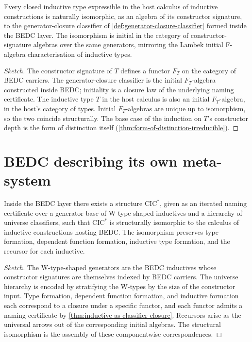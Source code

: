 \begin{theorem}
\label{thm:inductive-as-classifier-closure}
Every closed inductive type expressible in the host calculus of inductive constructions is naturally isomorphic, as an algebra of its constructor signature, to the generator-closure classifier of \autoref{def:generator-closure-classifier} formed inside the BEDC layer. The isomorphism is initial in the category of constructor-signature algebras over the same generators, mirroring the Lambek initial F-algebra characterisation of inductive types.
\end{theorem}

\begin{proof}[Sketch]
The constructor signature of $T$ defines a functor $F_T$ on the category of BEDC carriers. The generator-closure classifier is the initial $F_T$-algebra constructed inside BEDC; initiality is a closure law of the underlying naming certificate. The inductive type $T$ in the host calculus is also an initial $F_T$-algebra, in the host's category of types. Initial $F_T$-algebras are unique up to isomorphism, so the two coincide structurally. The base case of the induction on $T$'s constructor depth is the form of distinction itself (\autoref{thm:form-of-distinction-irreducible}).
\end{proof}

\section{BEDC describing its own meta-system}
\label{sec:reflection-self-description}

\begin{theorem}
\label{thm:internal-cic-interpretation}
Inside the BEDC layer there exists a structure $\mathrm{CIC}^{*}$, given as an iterated naming certificate over a generator base of W-type-shaped inductives and a hierarchy of universe classifiers, such that $\mathrm{CIC}^{*}$ is structurally isomorphic to the calculus of inductive constructions hosting BEDC. The isomorphism preserves type formation, dependent function formation, inductive type formation, and the recursor for each inductive.
\end{theorem}

\begin{proof}[Sketch]
The W-type-shaped generators are the BEDC inductives whose constructor signatures are themselves indexed by BEDC carriers. The universe hierarchy is encoded by stratifying the W-types by the size of the constructor input. Type formation, dependent function formation, and inductive formation each correspond to a closure under a specific functor, and each functor admits a naming certificate by \autoref{thm:inductive-as-classifier-closure}. Recursors arise as the universal arrows out of the corresponding initial algebras. The structural isomorphism is the assembly of these componentwise correspondences.
\end{proof}

